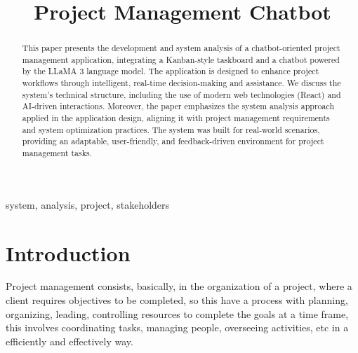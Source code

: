\documentclass[conference]{IEEEtran}
\begin{document}
	
	\title{Project Management Chatbot}
	
	\author{
		\and
		
	}
	
	\maketitle
	
	\begin{abstract}
		This paper presents the development and system analysis of a chatbot-oriented project management application, integrating a Kanban-style taskboard and a chatbot powered by the LLaMA 3 language model. The application is designed to enhance project workflows through intelligent, real-time decision-making and assistance. We discuss the system’s technical structure, including the use of modern web technologies (React) and AI-driven interactions. Moreover, the paper emphasizes the system analysis approach applied in the application design, aligning it with project management requirements and system optimization practices. The system was built for real-world scenarios, providing an adaptable, user-friendly, and feedback-driven environment for project management tasks.
		
	\end{abstract}
	
	\begin{IEEEkeywords}
		system, analysis, project, stakeholders
	\end{IEEEkeywords}
	
	\section{Introduction}
	Project management consists, basically, in the organization of a project, where a client requires objectives to be completed, so this have a process with planning, organizing, leading, controlling resources to complete the goals at a time frame, this involves coordinating tasks, managing people, overseeing activities, etc in a efficiently and effectively way.\\
	
\end{document}

